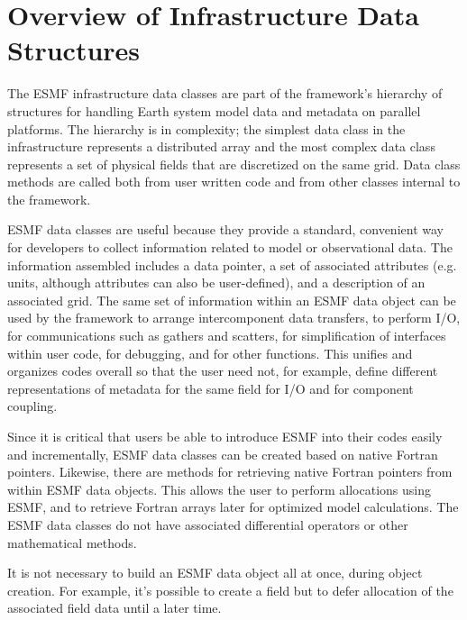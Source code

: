 
\section{Overview of Infrastructure Data Structures}

The ESMF infrastructure data classes are part of the framework's 
hierarchy of structures for handling Earth system model data and 
metadata on parallel platforms.  The hierarchy is in complexity; the simplest 
data class in the infrastructure represents a distributed array and the most
complex data class represents a set of physical fields that are discretized 
on the same grid.  Data class methods are called both from user 
written code and from other classes internal to the framework.  

ESMF data classes are useful because they provide a 
standard, convenient way for developers to collect information 
related to model or observational data.  The information assembled 
includes a data pointer, a set of associated attributes (e.g. units, 
although attributes can also be user-defined), and a 
description of an associated grid.  The same set of information within 
an ESMF data object can be used by the framework to arrange 
intercomponent data transfers, to perform I/O, for communications
such as gathers and scatters, for simplification of interfaces 
within user code, for debugging, and for other functions.  
This unifies and organizes codes overall so that the user need not,
for example, define different representations of metadata for the
same field for I/O and for component coupling.  

Since it is critical that users be able to introduce ESMF into their
codes easily and incrementally, ESMF data classes can be created based 
on native Fortran pointers.  Likewise, there are methods for retrieving 
native Fortran pointers from within ESMF data objects.  This allows
the user to perform allocations using ESMF, and to retrieve Fortran
arrays later for optimized model calculations.  The ESMF data classes 
do not have associated differential operators or other mathematical 
methods.

It is not necessary to build an ESMF data object all at once, 
during object creation.  For example, it's possible to create a 
field but to defer allocation of the associated field data until 
a later time.

